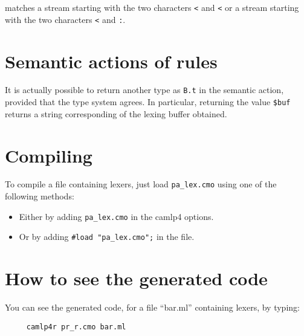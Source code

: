 \documentclass[11pt]{article}
\begin{document}
matches a stream starting with the two characters \verb/</ and
\verb/</ or a stream starting with the two characters \verb/</ and
\verb/:/.

\section{Semantic actions of rules}

It is actually possible to return another type as \verb/B.t/ in the
semantic action, provided that the type system agrees. In particular,
returning the value \verb/$buf/ returns a string corresponding of the
lexing buffer obtained.

\section{Compiling}

To compile a file containing lexers, just load \verb/pa_lex.cmo/ using
one of the following methods:

\begin{itemize}

\item Either by adding \verb/pa_lex.cmo/ in the camlp4 options.
\item Or by adding \verb/#load "pa_lex.cmo";/ in the file.

\end{itemize}

\section{How to see the generated code}

You can see the generated code, for a file ``bar.ml'' containing lexers, by
typing:

\begin{verbatim}
     camlp4r pr_r.cmo bar.ml
\end{verbatim}
\end{document}
